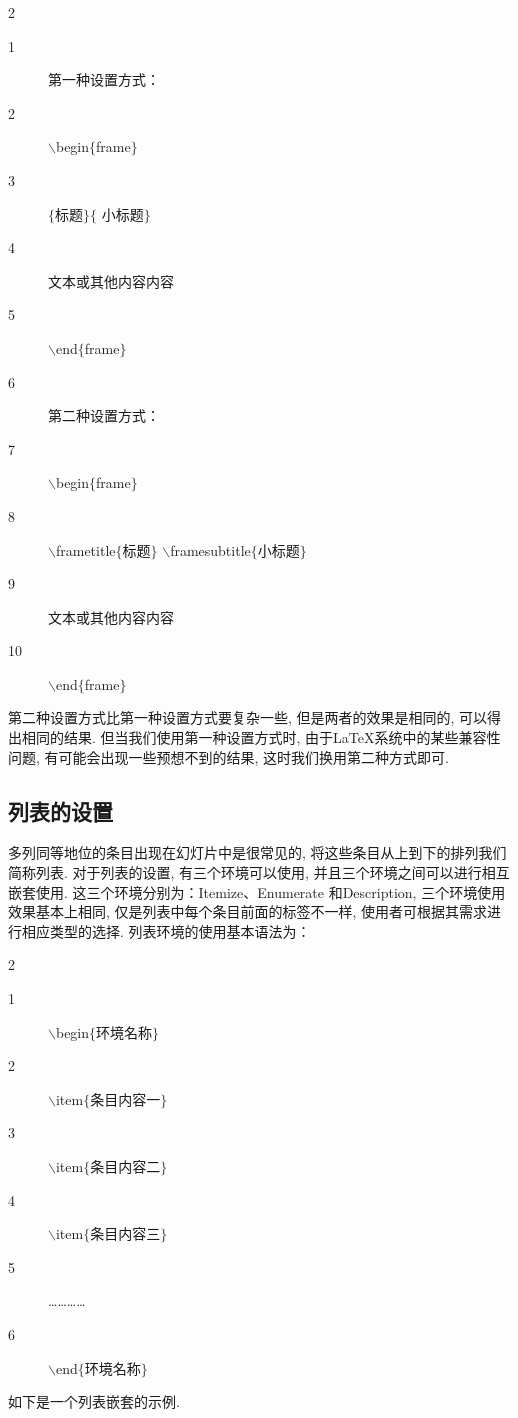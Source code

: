 \begin{multicols}{2}
\begin{description}
    \item[1] 第一种设置方式：
   \item[2] $\backslash$begin$\{$frame$\}$
   \item[3] $\{$标题$\}\{$ 小标题$\}$
   \item[4] 文本或其他内容内容
   \item[5]$\backslash$end$\{$frame$\}$
   \item[6] 第二种设置方式：
   \item[7]$\backslash$begin$\{$frame$\}$
   \item[8]$\backslash$frametitle\!$\{$\!标题\!$\}$
$\backslash$framesubtitle$\{$小标题$\}$
   \item[9] 文本或其他内容内容
   \item[10]$\backslash$end$\{$frame$\}$
\end{description}
 \end{multicols}\vspace*{-10pt}
第二种设置方式比第一种设置方式要复杂一些, 但是两者的效果是相同的, 可以得出相同的结果. 但当我们使用第一种设置方式时, 由于\LaTeX{}系统中的某些兼容性问题, 有可能会出现一些预想不到的结果, 这时我们换用第二种方式即可.
\subsection{列表的设置}

多列同等地位的条目出现在幻灯片中是很常见的, 将这些条目从上到下的排列我们简称列表. 对于列表的设置, 有三个环境可以使用, 并且三个环境之间可以进行相互嵌套使用. 这三个环境分别为：Itemize、Enumerate 和Description, 三个环境使用效果基本上相同, 仅是列表中每个条目前面的标签不一样, 使用者可根据其需求进行相应类型的选择. 列表环境的使用基本语法为：\vspace*{-10pt}
\begin{multicols}{2}
\begin{description}
  \item[1]$\backslash$begin$\{$环境名称$\}$
  \item[2]$\backslash$item$\{$条目内容一$\}$
  \item[3]$\backslash$item$\{$条目内容二$\}$
  \item[4]$\backslash$item$\{$条目内容三$\}$
  \item[5] …………
  \item[6]$\backslash$end$\{$环境名称$\}$\end{description}
 \end{multicols}\vspace*{-10pt}
如下是一个列表嵌套的示例.

